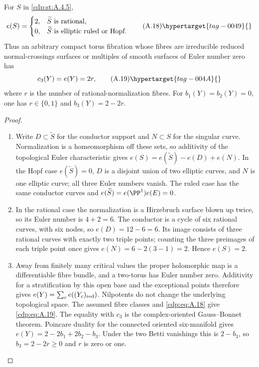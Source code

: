 \begin{proposition}\hypertarget{tag-01AV}{}\label{cdp:st:A.4.6}

For $S$ in \ref{cdp:st:A.4.5},
\[
e(S)=\begin{cases}
2,&\widetilde S\text{ is rational},\\
0,&\widetilde S\text{ is elliptic ruled or Hopf}.
\end{cases}
\tag{A.18}\hypertarget{tag-0049}{}\label{cdp:eq:A.18}
\]
Thus an arbitrary compact torus fibration whose fibres are irreducible reduced normal-crossings surfaces or multiples of smooth surfaces of Euler number zero has
\[
c_3(Y)=e(Y)=2r,
\tag{A.19}\hypertarget{tag-004A}{}\label{cdp:eq:A.19}
\]
where $r$ is the number of rational-normalization fibres. For $b_1(Y)=b_2(Y)=0$, one has $r\in\{0,1\}$ and $b_3(Y)=2-2r$.
\end{proposition}


\begin{proof}

\begin{enumerate}[label={$\langle1\rangle$\arabic*.},leftmargin=*]
\item Write $D\subset\widetilde S$ for the conductor support and $N\subset S$ for the singular curve. Normalization is a homeomorphism off these sets, so additivity of the topological Euler characteristic gives $e(S)=e(\widetilde S)-e(D)+e(N)$. In the Hopf case $e(\widetilde S)=0$, $D$ is a disjoint union of two elliptic curves, and $N$ is one elliptic curve; all three Euler numbers vanish. The ruled case has the same conductor curves and $e(\widetilde S)=e(\PP^1)e(E)=0$.

\item In the rational case the normalization is a Hirzebruch surface blown up twice, so its Euler number is $4+2=6$. The conductor is a cycle of six rational curves, with six nodes, so $e(D)=12-6=6$. Its image consists of three rational curves with exactly two triple points; counting the three preimages of each triple point once gives $e(N)=6-2(3-1)=2$. Hence $e(S)=2$.

\item Away from finitely many critical values the proper holomorphic map is a differentiable fibre bundle, and a two-torus has Euler number zero. Additivity for a stratification by this open base and the exceptional points therefore gives $e(Y)=\sum_c e((Y_c)_{\rm red})$. Nilpotents do not change the underlying topological space. The assumed fibre classes and \eqref{cdp:eq:A.18} give \eqref{cdp:eq:A.19}. The equality with $c_3$ is the complex-oriented Gauss--Bonnet theorem. Poincare duality for the connected oriented six-manifold gives $e(Y)=2-2b_1+2b_2-b_3$. Under the two Betti vanishings this is $2-b_3$, so $b_3=2-2r\ge0$ and $r$ is zero or one.

\end{enumerate}
\end{proof}